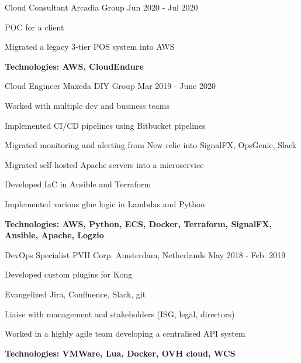 \begin{cventries}
\hfill\begin{minipage}{\dimexpr\textwidth-1cm}
\xdef\tpd{\the\prevdepth}
\begin{cventrystack}
	\cventry
	{Cloud Consultant} %
	{Arcadia Group} %
	{} %
	{Jun 2020 - Jul 2020} %
	{ %
		\begin{cvitems}
			\item {POC for a client}
			\item {Migrated a legacy 3-tier POS system into AWS}
			\item {\bfseries{Technologies:} AWS, CloudEndure}
		\end{cvitems}
	}

	\cventry
	{Cloud Engineer} %
	{Maxeda DIY Group} %
	{} %
	{Mar 2019 - June 2020} %
	{ %
		\begin{cvitems}
			\item {Worked with multiple dev and business teams}
			\item {Implemented CI/CD pipelines using Bitbucket pipelines}
			\item {Migrated monitoring and alerting from New relic into SignalFX, OpsGenie, Slack}
			\item {Migrated self-hosted Apache servers into a microservice}
			\item {Developed IaC in Ansible and Terraform}
			\item {Implemented various glue logic in Lambdas and Python}
			\item {\bfseries{Technologies:} AWS, Python, ECS, Docker, Terraform, SignalFX, Ansible, Apache, Logzio}
		\end{cvitems}
	}
\end{cventrystack}
\end{minipage}


\cventry
{DevOps Specialist} %
{PVH Corp.} %
{Amsterdam, Netherlands} %
{May 2018 - Feb. 2019} %
{ %
	\begin{cvitems}
		\item {Developed custom plugins for Kong}
		\item {Evangelized Jira, Confluence, Slack, git}
		\item {Liaise with management and stakeholders (ISG, legal, directors)}
		\item {Worked in a highly agile team developing a centralised API system}
		\item {\bfseries{Technologies:} VMWare, Lua, Docker, OVH cloud, WCS}
	\end{cvitems}
}


\end{cventries}
